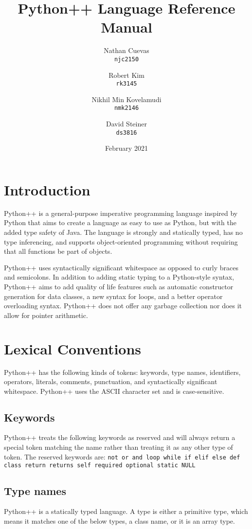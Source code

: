 \documentclass{article}
\title{Python++ Language Reference Manual}
\author{
Nathan Cuevas\\
\texttt{njc2150} 
\and
Robert Kim\\
\texttt{rk3145} \and
Nikhil Min Kovelamudi \\
\texttt{nmk2146} \and
David Steiner \\
\texttt{ds3816}
}
\date{February 2021}
\begin{document}
\maketitle
\tableofcontents

\section{Introduction}
Python++ is a general-purpose imperative programming language inspired by Python that aims to create a language as easy to use as Python, but with the added type safety of Java. The language is strongly and statically typed, has no type inferencing, and supports object-oriented programming without requiring that all functions be part of objects.

Python++ uses syntactically significant whitespace as opposed to curly braces and semicolons. In addition to adding static typing to a Python-style syntax, Python++ aims to add quality of life features such as automatic constructor generation for data classes, a new syntax for loops, and a better operator overloading syntax. Python++ does not offer any garbage collection nor does it allow for pointer arithmetic.

\section{Lexical Conventions}
Python++ has the following kinds of tokens: keywords, type names, identifiers, operators, literals, comments, punctuation, and syntactically significant whitespace. Python++ uses the ASCII character set and is case-sensitive.

\subsection{Keywords}
Python++ treats the following keywords as reserved and will always return a special token matching the name rather than treating it as any other type of token. The reserved keywords are:
\texttt{not or and loop while if elif else def class return returns self required optional static NULL}

\subsection{Type names}
Python++ is a statically typed language. A type is either a primitive type, which means it matches one of the below types, a class name, or it is an array type.
\end{document}
